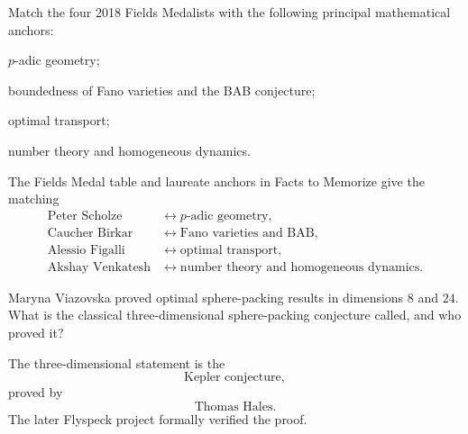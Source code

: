     \begin{expectedproblem}
        Match the four 2018 Fields Medalists with the following principal
        mathematical anchors:
        \begin{problemchoices}
            \item $p$-adic geometry;
            \item boundedness of Fano varieties and the BAB conjecture;
            \item optimal transport;
            \item number theory and homogeneous dynamics.
        \end{problemchoices}
    \end{expectedproblem}

    \begin{solution}
        The Fields Medal table and laureate anchors in Facts to Memorize give the
        matching
        \[
            \boxed{
                \begin{aligned}
                    \text{Peter Scholze}
                    &\longleftrightarrow p\text{-adic geometry},\\
                    \text{Caucher Birkar}
                    &\longleftrightarrow \text{Fano varieties and BAB},\\
                    \text{Alessio Figalli}
                    &\longleftrightarrow \text{optimal transport},\\
                    \text{Akshay Venkatesh}
                    &\longleftrightarrow
                    \text{number theory and homogeneous dynamics}.
                \end{aligned}
            }
        \]
    \end{solution}

    \begin{expectedproblem}
        Maryna Viazovska proved optimal sphere-packing results in dimensions
        $8$ and $24$. What is the classical three-dimensional sphere-packing
        conjecture called, and who proved it?
    \end{expectedproblem}

    \begin{solution}
        The three-dimensional statement is the
        \[
            \boxed{\text{Kepler conjecture}},
        \]
        proved by
        \[
            \boxed{\text{Thomas Hales}}.
        \]
        The later Flyspeck project formally verified the proof.
    \end{solution}

